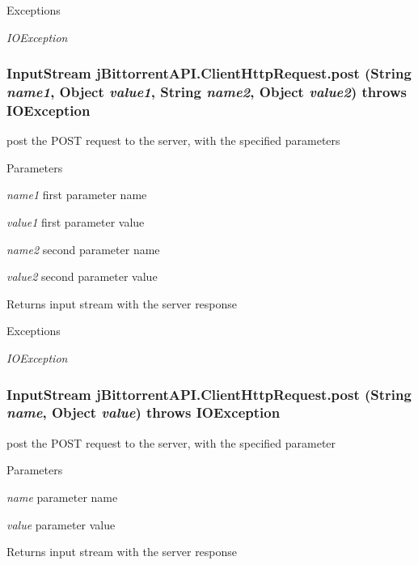 \begin{DoxyExceptions}{Exceptions}
\item[{\em IOException}]\end{DoxyExceptions}
\hypertarget{classj_bittorrent_a_p_i_1_1_client_http_request_ab11b408775fe9d5277cfefb4e52041e9}{
\subsubsection[{post}]{\setlength{\rightskip}{0pt plus 5cm}InputStream jBittorrentAPI.ClientHttpRequest.post (String {\em name1}, \/  Object {\em value1}, \/  String {\em name2}, \/  Object {\em value2})  throws IOException }}
\label{classj_bittorrent_a_p_i_1_1_client_http_request_ab11b408775fe9d5277cfefb4e52041e9}
post the POST request to the server, with the specified parameters 
\begin{DoxyParams}{Parameters}
\item[{\em name1}]first parameter name \item[{\em value1}]first parameter value \item[{\em name2}]second parameter name \item[{\em value2}]second parameter value \end{DoxyParams}
\begin{DoxyReturn}{Returns}
input stream with the server response 
\end{DoxyReturn}

\begin{DoxyExceptions}{Exceptions}
\item[{\em IOException}]\end{DoxyExceptions}
\hypertarget{classj_bittorrent_a_p_i_1_1_client_http_request_a607da2c2ac9464fae658e06550d39e3e}{
\subsubsection[{post}]{\setlength{\rightskip}{0pt plus 5cm}InputStream jBittorrentAPI.ClientHttpRequest.post (String {\em name}, \/  Object {\em value})  throws IOException }}
\label{classj_bittorrent_a_p_i_1_1_client_http_request_a607da2c2ac9464fae658e06550d39e3e}
post the POST request to the server, with the specified parameter 
\begin{DoxyParams}{Parameters}
\item[{\em name}]parameter name \item[{\em value}]parameter value \end{DoxyParams}
\begin{DoxyReturn}{Returns}
input stream with the server response 
\end{DoxyReturn}

